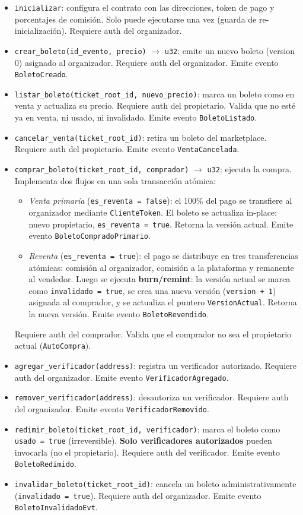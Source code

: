 \documentclass[12pt,oneside]{article}
\begin{document}
\begin{itemize}
  \item \texttt{inicializar}: configura el contrato con las direcciones, token de pago y porcentajes de comisión. Solo puede ejecutarse una vez (guarda de re-inicialización). Requiere auth del organizador.
  \item \texttt{crear\_boleto(id\_evento, precio)} $\rightarrow$ \texttt{u32}: emite un nuevo boleto (version 0) asignado al organizador. Requiere auth del organizador. Emite evento \texttt{BoletoCreado}.
  \item \texttt{listar\_boleto(ticket\_root\_id, nuevo\_precio)}: marca un boleto como en venta y actualiza su precio. Requiere auth del propietario. Valida que no esté ya en venta, ni usado, ni invalidado. Emite evento \texttt{BoletoListado}.
  \item \texttt{cancelar\_venta(ticket\_root\_id)}: retira un boleto del marketplace. Requiere auth del propietario. Emite evento \texttt{VentaCancelada}.
  \item \texttt{comprar\_boleto(ticket\_root\_id, comprador)} $\rightarrow$ \texttt{u32}: ejecuta la compra. Implementa dos flujos en una sola transacción atómica:
    \begin{itemize}
      \item \textit{Venta primaria} (\texttt{es\_reventa = false}): el 100\% del pago se transfiere al organizador mediante \texttt{ClienteToken}. El boleto se actualiza in-place: nuevo propietario, \texttt{es\_reventa = true}. Retorna la versión actual. Emite evento \texttt{BoletoCompradoPrimario}.
      \item \textit{Reventa} (\texttt{es\_reventa = true}): el pago se distribuye en tres transferencias atómicas: comisión al organizador, comisión a la plataforma y remanente al vendedor. Luego se ejecuta \textbf{burn/remint}: la versión actual se marca como \texttt{invalidado = true}, se crea una nueva versión (\texttt{version + 1}) asignada al comprador, y se actualiza el puntero \texttt{VersionActual}. Retorna la nueva versión. Emite evento \texttt{BoletoRevendido}.
    \end{itemize}
    Requiere auth del comprador. Valida que el comprador no sea el propietario actual (\texttt{AutoCompra}).
  \item \texttt{agregar\_verificador(address)}: registra un verificador autorizado. Requiere auth del organizador. Emite evento \texttt{VerificadorAgregado}.
  \item \texttt{remover\_verificador(address)}: desautoriza un verificador. Requiere auth del organizador. Emite evento \texttt{VerificadorRemovido}.
  \item \texttt{redimir\_boleto(ticket\_root\_id, verificador)}: marca el boleto como \texttt{usado = true} (irreversible). \textbf{Solo verificadores autorizados} pueden invocarla (no el propietario). Requiere auth del verificador. Emite evento \texttt{BoletoRedimido}.
  \item \texttt{invalidar\_boleto(ticket\_root\_id)}: cancela un boleto administrativamente (\texttt{invalidado = true}). Requiere auth del organizador. Emite evento \texttt{BoletoInvalidadoEvt}.
\end{itemize}
\end{document}
